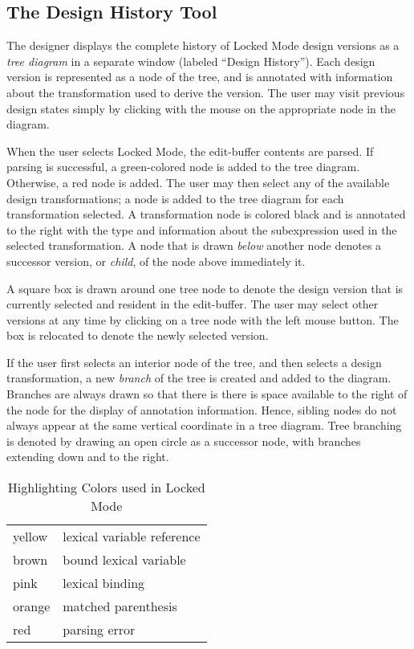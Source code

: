\documentclass{article}
\begin{document}
\subsection{The Design History Tool}

The designer displays the complete history of Locked Mode design
versions as a {\em tree diagram\/} in a separate window (labeled
``Design History'').  Each design version is represented as a node of
the tree, and is annotated with information about the transformation
used to derive the version.  The user may visit previous design states
simply by clicking with the mouse on the appropriate node in the
diagram.

When the user selects Locked Mode, the edit-buffer contents are
parsed.  If parsing is successful, a green-colored node is added to
the tree diagram.  Otherwise, a red node is added.  The user may then
select any of the available design transformations; a node is added to
the tree diagram for each transformation selected.  A transformation
node is colored black and is annotated to the right with the type and
information about the subexpression used in the selected
transformation.  A node that is drawn {\em below\/} another node
denotes a successor version, or {\em child}, of the node above
immediately it.

A square box is drawn around one tree node to denote the design
version that is currently selected and resident in the edit-buffer.
The user may select other versions at any time by clicking on a tree
node with the left mouse button.  The box is relocated to denote the
newly selected version.

If the user first selects an interior node of the tree, and then
selects a design transformation, a new {\em branch\/} of the tree is
created and added to the diagram.  Branches are always drawn so that
there is there is space available to the right of the node for the
display of annotation information.  Hence, sibling nodes do not always
appear at the same vertical coordinate in a tree diagram. Tree
branching is denoted by drawing an open circle as a successor node,
with branches extending down and to the right.



\begin{table}\centering
\begin{tabular}[]{|l|l|}
\hline
yellow & lexical variable reference     \\
brown & bound lexical variable   \\
pink  & lexical binding     \\
orange & matched parenthesis \\
red  & parsing error     \\
\hline
\end{tabular}
\caption{Highlighting Colors used in Locked Mode}\label{tab:highlight}
\end{table}
\end{document}
